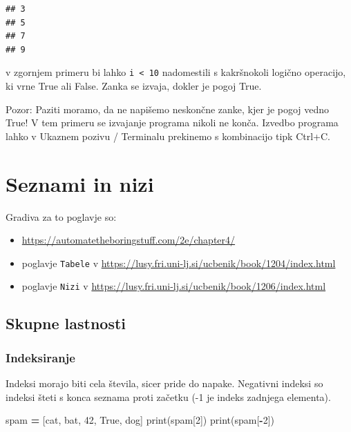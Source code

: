 \documentclass[
]{book}
\newenvironment{Shaded}{\begin{snugshade}}{\end{snugshade}}
\newcommand{\BuiltInTok}[1]{#1}
\newcommand{\DecValTok}[1]{\textcolor[rgb]{0.00,0.00,0.81}{#1}}
\newcommand{\NormalTok}[1]{#1}
\newcommand{\OperatorTok}[1]{\textcolor[rgb]{0.81,0.36,0.00}{\textbf{#1}}}
\newcommand{\StringTok}[1]{\textcolor[rgb]{0.31,0.60,0.02}{#1}}
\newcommand{\VariableTok}[1]{\textcolor[rgb]{0.00,0.00,0.00}{#1}}
\providecommand{\tightlist}{%
  \setlength{\itemsep}{0pt}\setlength{\parskip}{0pt}}
\begin{document}
\begin{verbatim}
## 3
## 5
## 7
## 9
\end{verbatim}

v zgornjem primeru bi lahko \texttt{i\ \textless{}\ 10} nadomestili s kakršnokoli logično operacijo,
ki vrne True ali False. Zanka se izvaja, dokler je pogoj True.

Pozor: Paziti moramo, da ne napišemo neskončne zanke, kjer je pogoj vedno True!
V tem primeru se izvajanje programa nikoli ne konča. Izvedbo programa lahko v
Ukaznem pozivu / Terminalu prekinemo s kombinacijo tipk Ctrl+C.

\hypertarget{seznami-in-nizi}{%
\chapter{Seznami in nizi}\label{seznami-in-nizi}}

Gradiva za to poglavje so:

\begin{itemize}
\tightlist
\item
  \url{https://automatetheboringstuff.com/2e/chapter4/}
\item
  poglavje \texttt{Tabele} v \url{https://lusy.fri.uni-lj.si/ucbenik/book/1204/index.html}
\item
  poglavje \texttt{Nizi} v \url{https://lusy.fri.uni-lj.si/ucbenik/book/1206/index.html}
\end{itemize}

\hypertarget{skupne-lastnosti}{%
\section{Skupne lastnosti}\label{skupne-lastnosti}}

\hypertarget{indeksiranje}{%
\subsection{Indeksiranje}\label{indeksiranje}}

Indeksi morajo biti cela števila, sicer pride do napake. Negativni indeksi so
indeksi šteti s konca seznama proti začetku (-1 je indeks zadnjega elementa).

\begin{Shaded}
\begin{Highlighting}[]
\NormalTok{spam }\OperatorTok{=}\NormalTok{ [}\StringTok{\textquotesingle{}cat\textquotesingle{}}\NormalTok{, }\StringTok{\textquotesingle{}bat\textquotesingle{}}\NormalTok{, }\DecValTok{42}\NormalTok{, }\VariableTok{True}\NormalTok{, }\StringTok{\textquotesingle{}dog\textquotesingle{}}\NormalTok{]}
\BuiltInTok{print}\NormalTok{(spam[}\DecValTok{2}\NormalTok{])}
\BuiltInTok{print}\NormalTok{(spam[}\OperatorTok{{-}}\DecValTok{2}\NormalTok{])}
\end{Highlighting}
\end{Shaded}
\end{document}
